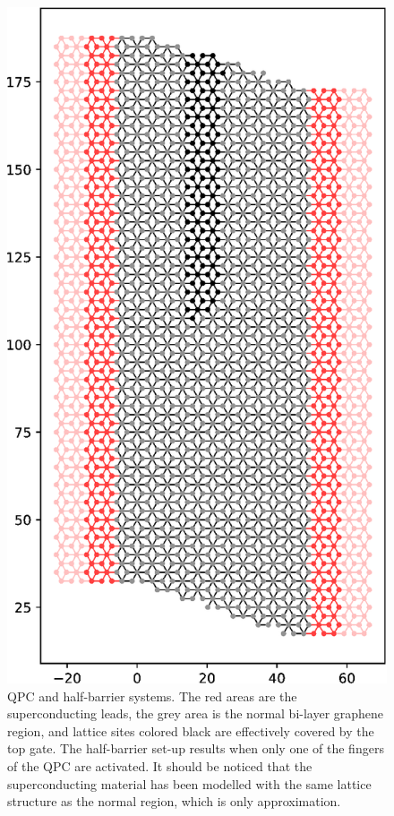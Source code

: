 \begin{figure}[ht]
\begin{minipage}[b]{0.3\linewidth}
\includegraphics[width=\textwidth]{figure/numericalmodel/hb-system}
\end{minipage}
\caption{QPC and half-barrier systems. The red areas are the superconducting leads, the grey area is the normal bi-layer graphene region, and lattice sites colored black are effectively covered by the top gate. The half-barrier set-up results when only one of the fingers of the QPC are activated. It should be noticed that the superconducting material has been modelled with the same lattice structure as the normal region, which is only approximation.}\label{fig:systems}
\end{figure}

